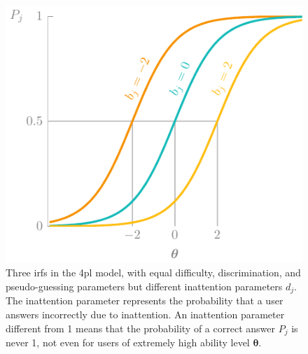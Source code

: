 \begin{figure}
    \centering
    \includegraphics[page=5]{03-education/figures/tikzfigures.pdf}
    \caption[Item response functions of the 4PL model]{Three \glspl{irf} in the \gls{4pl} model, with equal difficulty, discrimination, and pseudo-guessing parameters but different inattention parameters $d_j$. The inattention parameter represents the probability that a user answers incorrectly due to inattention. An inattention parameter different from 1 means that the probability of a correct answer $P_j$ is never 1, not even for users of extremely high ability level $\bm\theta$.}
    \label{fig:4pl}
\end{figure}


